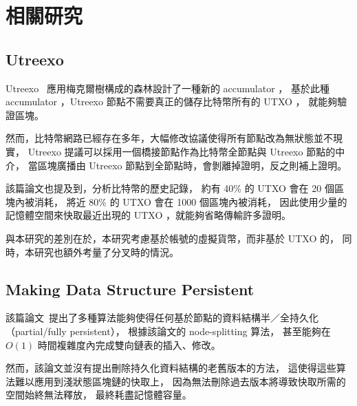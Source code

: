 \chapter{相關研究}
\label{c:related}

\section{Utreexo}
Utreexo~\cite{dryja2019utreexo} 應用梅克爾樹構成的森林設計了一種新的 accumulator ，
基於此種 accumulator ，Utreexo 節點不需要真正的儲存比特幣所有的 UTXO ，
就能夠驗證區塊。

然而，比特幣網路已經存在多年，大幅修改協議使得所有節點改為無狀態並不現實，
Utreexo 提議可以採用一個橋接節點作為比特幣全節點與 Utreexo 節點的中介，
當區塊廣播由 Utreexo 節點到全節點時，會剝離掉證明，反之則補上證明。

該篇論文也提及到，分析比特幣的歷史記錄，
約有 40\% 的 UTXO 會在 20 個區塊內被消耗，
將近 80\% 的 UTXO 會在 1000 個區塊內被消耗，
因此使用少量的記憶體空間來快取最近出現的 UTXO ，就能夠省略傳輸許多證明。

與本研究的差別在於，本研究考慮基於帳號的虛擬貨幣，而非基於 UTXO 的，
同時，本研究也額外考量了分叉時的情況。

\section{Making Data Structure Persistent}
該篇論文~\cite{driscoll1986making}提出了多種算法能夠使得任何基於節點的資料結構半／全持久化（partial/fully persistent），
根據該論文的 node-splitting 算法，
甚至能夠在 $O(1)$ 時間複雜度內完成雙向鏈表的插入、修改。

然而，該論文並沒有提出刪除持久化資料結構的老舊版本的方法，
這使得這些算法難以應用到淺狀態區塊鏈的快取上，
因為無法刪除過去版本將導致快取所需的空間始終無法釋放，
最終耗盡記憶體容量。